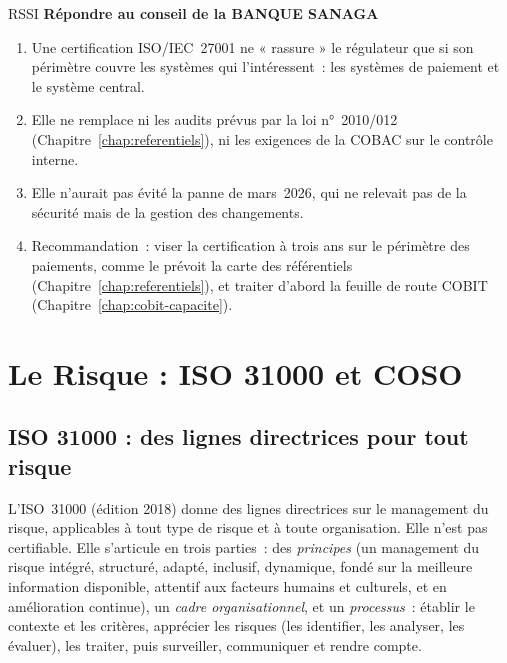 \begin{boxmetier}{RSSI}
\textbf{Répondre au conseil de la BANQUE SANAGA}
\begin{enumerate}
    \item Une certification ISO/IEC~27001 ne « rassure » le régulateur que
          si son périmètre couvre les systèmes qui l'intéressent~: les
          systèmes de paiement et le système central.
    \item Elle ne remplace ni les audits prévus par la loi n°~2010/012
          (Chapitre~\ref{chap:referentiels}), ni les exigences de la COBAC
          sur le contrôle interne.
    \item Elle n'aurait pas évité la panne de mars~2026, qui ne relevait
          pas de la sécurité mais de la gestion des changements.
    \item Recommandation~: viser la certification à trois ans sur le
          périmètre des paiements, comme le prévoit la carte des
          référentiels (Chapitre~\ref{chap:referentiels}), et traiter
          d'abord la feuille de route COBIT (Chapitre~\ref{chap:cobit-capacite}).
\end{enumerate}
\end{boxmetier}

\section{Le Risque : ISO 31000 et COSO}
\label{sec:c09-risque}

\subsection{ISO 31000 : des lignes directrices pour tout risque}

L'ISO~31000 (édition 2018) donne des lignes directrices sur le management
du risque, applicables à tout type de risque et à toute organisation. Elle
n'est pas certifiable. Elle s'articule en trois parties~: des
\emph{principes} (un management du risque intégré, structuré, adapté,
inclusif, dynamique, fondé sur la meilleure information disponible,
attentif aux facteurs humains et culturels, et en amélioration continue),
un \emph{cadre organisationnel}, et un \emph{processus}~: établir le
contexte et les critères, apprécier les risques (les identifier, les
analyser, les évaluer), les traiter, puis surveiller, communiquer et
rendre compte.

